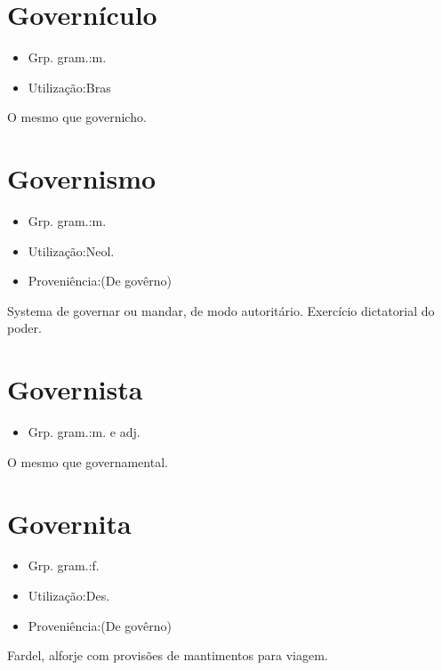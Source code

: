 \section{Governículo}
\begin{itemize}
\item {Grp. gram.:m.}
\end{itemize}
\begin{itemize}
\item {Utilização:Bras}
\end{itemize}
O mesmo que \textunderscore governicho\textunderscore .
\section{Governismo}
\begin{itemize}
\item {Grp. gram.:m.}
\end{itemize}
\begin{itemize}
\item {Utilização:Neol.}
\end{itemize}
\begin{itemize}
\item {Proveniência:(De \textunderscore govêrno\textunderscore )}
\end{itemize}
Systema de governar ou mandar, de modo autoritário.
Exercício dictatorial do poder.
\section{Governista}
\begin{itemize}
\item {Grp. gram.:m.  e  adj.}
\end{itemize}
O mesmo que \textunderscore governamental\textunderscore .
\section{Governita}
\begin{itemize}
\item {Grp. gram.:f.}
\end{itemize}
\begin{itemize}
\item {Utilização:Des.}
\end{itemize}
\begin{itemize}
\item {Proveniência:(De \textunderscore govêrno\textunderscore )}
\end{itemize}
Fardel, alforje com provisões de mantimentos para viagem.
